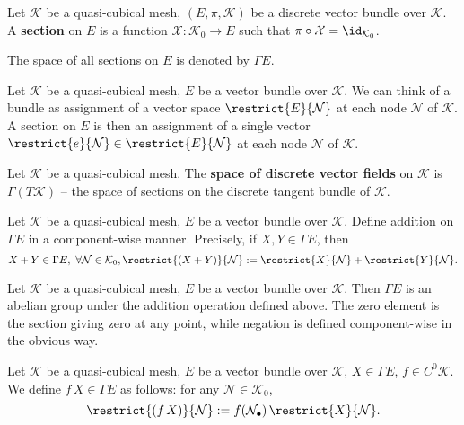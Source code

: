 \begin{proposition}
  Let
    $\mathcal{K}$ be a quasi-cubical mesh,
    $(E, \pi, \mathcal{K})$ be a discrete vector bundle over $\mathcal{K}$.
  A \textbf{section} on $E$ is a function
  $\mathcal{X} \colon \mathcal{K}_0 \to E$
  such that
  $\pi \circ \mathcal{X} = \id_{\mathcal{K}_{0}}$.

  The space of all sections on $E$ is denoted by $\Gamma E$.
\end{proposition}
\begin{remark}
  Let
    $\mathcal{K}$ be a quasi-cubical mesh,
    $E$ be a vector bundle over $\mathcal{K}$.
  We can think of a bundle as assignment of a vector space
  $\restrict{E}{\mathcal{N}}$ at each node $\mathcal{N}$ of $\mathcal{K}$.
  A section on $E$ is then an assignment of a single vector
  $\restrict{e}{\mathcal{N}} \in\restrict{E}{\mathcal{N}}$
  at each node $\mathcal{N}$ of $\mathcal{K}$.
\end{remark}
\begin{example}
  Let $\mathcal{K}$ be a quasi-cubical mesh.
  The \textbf{space of discrete vector fields} on $\mathcal{K}$ is
  $\Gamma(T \mathcal{K})$ -- the space of sections on the discrete tangent
  bundle of $\mathcal{K}$.
\end{example}
\begin{definition}
  Let
    $\mathcal{K}$ be a quasi-cubical mesh,
    $E$ be a vector bundle over $\mathcal{K}$.
  Define addition on $\Gamma E$ in a component-wise manner.
  Precisely, if $X, Y \in \Gamma E$, then
  \begin{equation}
    X + Y \in \Gamma E,\ \forall \mathcal{N} \in \mathcal{K}_0,
    \restrict{(X + Y)}{\mathcal{N}}
    := \restrict{X}{\mathcal{N}} + \restrict{Y}{\mathcal{N}}.
  \end{equation}
\end{definition}
\begin{proposition}
  Let
    $\mathcal{K}$ be a quasi-cubical mesh,
    $E$ be a vector bundle over $\mathcal{K}$.
  Then $\Gamma E$ is an abelian group under the addition operation defined
  above.
  The zero element is the section giving zero at any point, while negation is
  defined component-wise in the obvious way.
\end{proposition}
\begin{definition}
  Let
    $\mathcal{K}$ be a quasi-cubical mesh,
    $E$ be a vector bundle over $\mathcal{K}$,
    $X \in \Gamma E$,
    $f \in C^0 \mathcal{K}$.
  We define $f\, X \in \Gamma E$ as follows:
  for any $\mathcal{N} \in \mathcal{K}_0$,
  \begin{equation}
    \restrict{(f\, X)}{\mathcal{N}}
    := f(\mathcal{N}_\bullet)\, \restrict{X}{\mathcal{N}}.
  \end{equation}
\end{definition}
